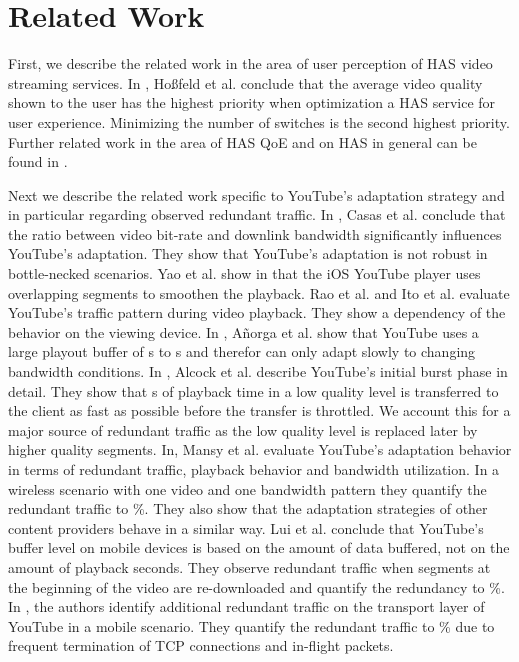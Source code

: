 
\section{Related Work}
\label{sec:relatedwork}

First, we describe the related work in the area of user perception of HAS video streaming services.
In \cite{hossfeld2015identifyingqoeoptimal}, Hoßfeld et al. conclude that the average video quality shown to the user has the highest priority when optimization a HAS service for user experience.
Minimizing the number of switches is the second highest priority.
Further related work in the area of HAS QoE and on HAS in general can be found in \cite{seufert2015survey}.

Next we describe the related work specific to YouTube's adaptation strategy and in particular regarding observed redundant traffic.
In \cite{casas2012youtube}, Casas et al. conclude that the ratio between video bit-rate and downlink bandwidth significantly influences YouTube's adaptation. 
They show that YouTube's adaptation is not robust in bottle-necked scenarios.
Yao et al. show in \cite{Yao2014b} that the iOS YouTube player uses overlapping segments to smoothen the playback.
Rao et al. \cite{rao2011network} and Ito et al. \cite{ito14networklevel} evaluate YouTube's traffic pattern during video playback. They show a dependency of the behavior on the viewing device.
In \cite{Anorga2015}, A\~norga et al. show that YouTube uses a large playout buffer of \unit[13]{s} to \unit[40]{s} and therefor can only adapt slowly to changing bandwidth conditions.
In \cite{alcock11application}, Alcock et al. describe YouTube's initial burst phase in detail. They show that \unit[32]{s} of playback time in a low quality level is transferred to the client as fast as possible before the transfer is throttled. We account this for a major source of redundant traffic as the low quality level is replaced later by higher quality segments.
In, \cite{Mansy2014} Mansy et al. evaluate YouTube's adaptation behavior in terms of redundant traffic, playback behavior and bandwidth utilization. In a wireless scenario with one video and one bandwidth pattern they quantify the redundant traffic to \unit[16]{\%}. They also show that the adaptation strategies of other content providers behave in a similar way.
Lui et al. \cite{liu2013comparative} conclude that YouTube's buffer level on mobile devices is based on the amount of data buffered, not on the amount of playback seconds. They observe redundant traffic when segments at the beginning of the video are re-downloaded and quantify the redundancy to \unit[15]{\%}.
In \cite{nam2013mobile}, the authors identify additional redundant traffic on the transport layer of YouTube in a mobile scenario. They quantify the redundant traffic to \unit[35]{\%} due to frequent termination of TCP connections and in-flight packets.

